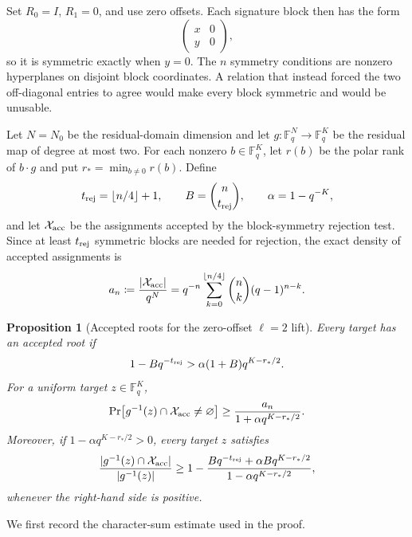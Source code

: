 \documentclass[11pt]{article}
\newtheorem{proposition}[proposition]{Proposition}
\newcommand{\F}{\mathbb F}
\begin{document}
Set $R_0=I$, $R_1=0$, and use zero offsets.  Each signature block then has
the form
\[
 \begin{pmatrix}x&0\\ y&0\end{pmatrix},
\]
so it is symmetric exactly when $y=0$.  The $n$ symmetry conditions are
nonzero hyperplanes on disjoint block coordinates.  A relation that instead
forced the two off-diagonal entries to agree would make every block symmetric
and would be unusable.

Let $N=N_0$ be the residual-domain dimension and let
$g:\F_q^N\to\F_q^K$ be the residual map of degree at most two.  For each
nonzero $b\in\F_q^K$, let $r(b)$ be the polar rank of $b\cdot g$ and put
$r_*=\min_{b\ne0}r(b)$.  Define
\[
 t_{\rm rej}=\lfloor n/4\rfloor+1,
 \qquad B=\binom n{t_{\rm rej}},
 \qquad \alpha=1-q^{-K},
\]
and let $\mathcal X_{\rm acc}$ be the assignments accepted by the
block-symmetry rejection test.  Since at least $t_{\rm rej}$ symmetric blocks
are needed for rejection, the exact density of accepted assignments is
\begin{equation}\label{eq:l2-accepted-density}
 a_n\coloneqq\frac{|\mathcal X_{\rm acc}|}{q^N}
 =q^{-n}\sum_{k=0}^{\lfloor n/4\rfloor}\binom nk(q-1)^{n-k}.
\end{equation}

\begin{proposition}[Accepted roots for the zero-offset $\ell=2$ lift]\label{prop:l2-rejection}
Every target has an accepted root if
\begin{equation}\label{eq:l2-rejection}
 1-Bq^{-t_{\rm rej}}>\alpha(1+B)q^{K-r_*/2}.
\end{equation}
For a uniform target $z\in\F_q^K$,
\begin{equation}\label{eq:l2-accepted-target}
 \Pr\bigl[g^{-1}(z)\cap\mathcal X_{\rm acc}\ne\varnothing\bigr]
 \ge \frac{a_n}{1+\alpha q^{K-r_*/2}}.
\end{equation}
Moreover, if $1-\alpha q^{K-r_*/2}>0$, every target $z$ satisfies
\begin{equation}\label{eq:l2-accepted-fraction}
 \frac{|g^{-1}(z)\cap\mathcal X_{\rm acc}|}{|g^{-1}(z)|}
 \ge
 1-\frac{Bq^{-t_{\rm rej}}+\alpha Bq^{K-r_*/2}}
          {1-\alpha q^{K-r_*/2}},
\end{equation}
whenever the right-hand side is positive.
\end{proposition}

We first record the character-sum estimate used in the proof.
\end{document}
